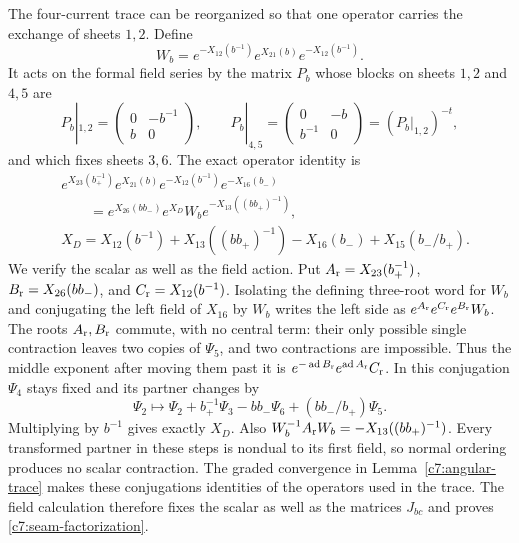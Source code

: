The four-current trace can be reorganized so that one operator carries the exchange of sheets $1,2$. Define
\[
W_b=e^{-X_{12}(b^{-1})}e^{X_{21}(b)}e^{-X_{12}(b^{-1})}.
\]
It acts on the formal field series by the matrix $P_b$ whose blocks on sheets $1,2$ and $4,5$ are
\[
P_b|_{1,2}=\begin{pmatrix}0&-b^{-1}\\ b&0\end{pmatrix},
\qquad
P_b|_{4,5}=\begin{pmatrix}0&-b\\ b^{-1}&0\end{pmatrix}
=(P_b|_{1,2})^{-t},
\]
and which fixes sheets $3,6$. The exact operator identity is
\begin{equation}\label{c7:seam-factorization}
\begin{aligned}
&e^{X_{23}(b_+^{-1})}e^{X_{21}(b)}
 e^{-X_{12}(b^{-1})}e^{-X_{16}(b_-)}
\\
&\qquad=
e^{X_{26}(bb_-)}e^{X_D}W_b
 e^{-X_{13}((bb_+)^{-1})},\\
&X_D=X_{12}(b^{-1})+X_{13}((bb_+)^{-1})
       -X_{16}(b_-)+X_{15}(b_-/b_+).
\end{aligned}
\end{equation}
We verify the scalar as well as the field action. Put
$A_{\rm r}=X_{23}(b_+^{-1})$, $B_{\rm r}=X_{26}(bb_-)$, and
$C_{\rm r}=X_{12}(b^{-1})$. Isolating the defining three-root word for $W_b$ and conjugating the left field of $X_{16}$ by $W_b$ writes the left side as
$e^{A_{\rm r}}e^{C_{\rm r}}e^{B_{\rm r}}W_b$.
The roots $A_{\rm r},B_{\rm r}$ commute, with no central term: their only possible single contraction leaves two copies of $\Psi_5$, and two contractions are impossible. Thus the middle exponent after moving them past it is
$e^{-\operatorname{ad}B_{\rm r}}e^{\operatorname{ad}A_{\rm r}}C_{\rm r}$.
In this conjugation $\Psi_4$ stays fixed and its partner changes by
\[
\Psi_2\longmapsto
\Psi_2+b_+^{-1}\Psi_3-bb_-\Psi_6+(bb_-/b_+)\Psi_5.
\]
Multiplying by $b^{-1}$ gives exactly $X_D$. Also
$W_b^{-1}A_{\rm r}W_b=-X_{13}((bb_+)^{-1})$.
Every transformed partner in these steps is nondual to its first field, so normal ordering produces no scalar contraction. The graded convergence in Lemma~\ref{c7:angular-trace} makes these conjugations identities of the operators used in the trace. The field calculation therefore fixes the scalar as well as the matrices $J_{bc}$ and proves \eqref{c7:seam-factorization}.

